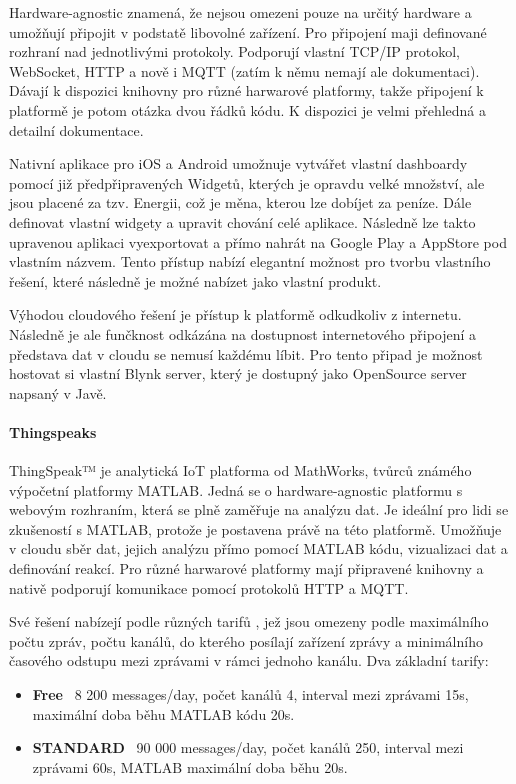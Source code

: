 Hardware-agnostic znamená, že nejsou omezeni pouze na určitý hardware a umožňují připojit v podstatě libovolné zařízení. Pro připojení maji definované rozhraní nad jednotlivými protokoly. Podporují vlastní TCP/IP protokol, WebSocket, HTTP a nově i MQTT (zatím k němu nemají ale dokumentaci). Dávají k dispozici knihovny pro různé harwarové platformy, takže připojení k platformě je potom otázka dvou řádků kódu. K dispozici je velmi přehledná a detailní dokumentace. \cite{blynk-doc}

Nativní aplikace pro iOS a Android umožnuje vytvářet vlastní dashboardy pomocí již předpřipravených Widgetů, kterých je opravdu velké množství, ale jsou placené za tzv. Energii, což je měna, kterou lze dobíjet za peníze. Dále definovat vlastní widgety a upravit chování celé aplikace. Následně lze takto upravenou aplikaci vyexportovat a přímo nahrát na Google Play a AppStore pod vlastním názvem. Tento přístup nabízí elegantní možnost pro tvorbu vlastního řešení, které následně je možné nabízet jako vlastní produkt. \cite{blynk}

Výhodou cloudového řešení je přístup k platformě odkudkoliv z internetu. Následně je ale funčknost odkázána na dostupnost internetového připojení a představa dat v cloudu se nemusí každému líbit. Pro tento připad je možnost hostovat si vlastní Blynk server, který je dostupný jako OpenSource server napsaný v Javě. \cite{blynk-server}

\paragraph{Thingspeaks}
ThingSpeak™ je analytická IoT platforma od MathWorks, tvůrců známého výpočetní platformy MATLAB. Jedná se o hardware-agnostic platformu s webovým rozhraním, která se plně zaměřuje na analýzu dat. Je ideální pro lidi se zkušeností s MATLAB, protože je postavena právě na této platformě. Umožňuje v cloudu sběr dat, jejich analýzu přímo pomocí MATLAB kódu, vizualizaci dat a definování reakcí. Pro různé harwarové platformy mají připravené knihovny a nativě podporují komunikace pomocí protokolů HTTP a MQTT. \cite{thingspeaks}

Své řešení nabízejí podle různých tarifů \cite{thingspeaks-pricing}, jež jsou omezeny podle maximálního počtu zpráv, počtu kanálů, do kterého posílají zařízení zprávy a minimálního časového odstupu mezi zprávami v rámci jednoho kanálu. Dva základní tarify:
\begin{itemize}
    \item \textbf{Free} ~8 200 messages/day, počet kanálů 4, interval mezi zprávami 15s, maximální doba běhu MATLAB kódu 20s.
    \item \textbf{STANDARD} ~90 000 messages/day, počet kanálů 250, interval mezi zprávami 60s, MATLAB maximální doba běhu 20s.
\end{itemize}

